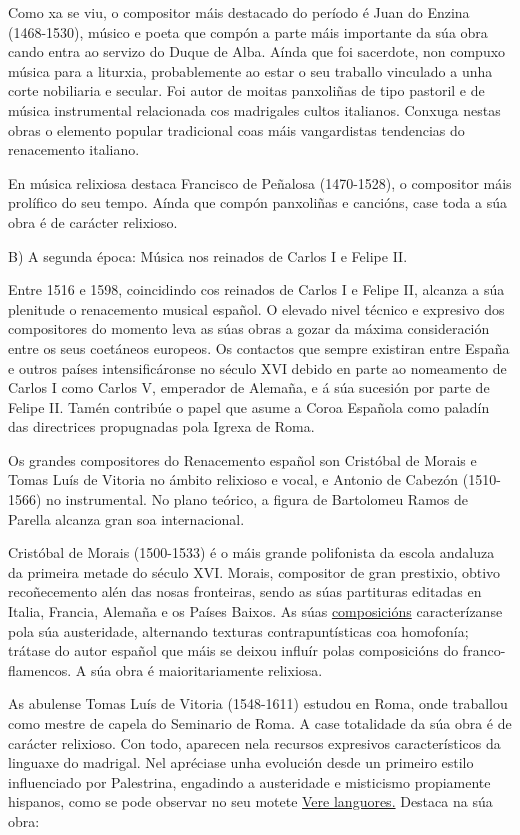 \documentclass[
]{article}
\begin{document}
Como xa se viu, o compositor máis destacado do período é Juan do Enzina
(1468-1530), músico e poeta que compón a parte máis importante da súa
obra cando entra ao servizo do Duque de Alba. Aínda que foi sacerdote,
non compuxo música para a liturxia, probablemente ao estar o seu
traballo vinculado a unha corte nobiliaria e secular. Foi autor de
moitas panxoliñas de tipo pastoril e de música instrumental relacionada
cos madrigales cultos italianos. Conxuga nestas obras o elemento popular
tradicional coas máis vangardistas tendencias do renacemento italiano.

En música relixiosa destaca Francisco de Peñalosa (1470-1528), o
compositor máis prolífico do seu tempo. Aínda que compón panxoliñas e
cancións, case toda a súa obra é de carácter relixioso.

B) A segunda época: Música nos reinados de Carlos I e Felipe II.

Entre 1516 e 1598, coincidindo cos reinados de Carlos I e Felipe II,
alcanza a súa plenitude o renacemento musical español. O elevado nivel
técnico e expresivo dos compositores do momento leva as súas obras a
gozar da máxima consideración entre os seus coetáneos europeos. Os
contactos que sempre existiran entre España e outros países
intensificáronse no século XVI debido en parte ao nomeamento de Carlos I
como Carlos V, emperador de Alemaña, e á súa sucesión por parte de
Felipe II. Tamén contribúe o papel que asume a Coroa Española como
paladín das directrices propugnadas pola Igrexa de Roma.

Os grandes compositores do Renacemento español son Cristóbal de Morais e
Tomas Luís de Vitoria no ámbito relixioso e vocal, e Antonio de Cabezón
(1510-1566) no instrumental. No plano teórico, a figura de Bartolomeu
Ramos de Parella alcanza gran soa internacional.

Cristóbal de Morais (1500-1533) é o máis grande polifonista da escola
andaluza da primeira metade do século XVI. Morais, compositor de gran
prestixio, obtivo recoñecemento alén das nosas fronteiras, sendo as súas
partituras editadas en Italia, Francia, Alemaña e os Países Baixos. As
súas
\href{http://open.spotify.com/track/68KvnM5BJ153VwHjQOMaKN}{composicións}
caracterízanse pola súa austeridade, alternando texturas
contrapuntísticas coa homofonía; trátase do autor español que máis se
deixou influír polas composicións do franco-flamencos. A súa obra é
maioritariamente relixiosa.

As abulense Tomas Luís de Vitoria (1548-1611) estudou en Roma, onde
traballou como mestre de capela do Seminario de Roma. A case totalidade
da súa obra é de carácter relixioso. Con todo, aparecen nela recursos
expresivos característicos da linguaxe do madrigal. Nel apréciase unha
evolución desde un primeiro estilo influenciado por Palestrina,
engadindo a austeridade e misticismo propiamente hispanos, como se pode
observar no seu motete
\href{http://open.spotify.com/track/6WWvS5n5Btte7xchnbPOw1}{Vere
languores.} Destaca na súa obra:
\end{document}

